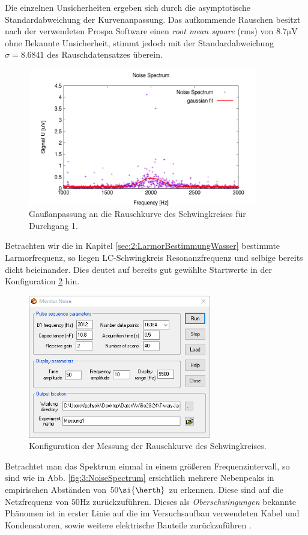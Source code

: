 \documentclass{article}
\begin{document}
    Die einzelnen Unsicherheiten ergeben sich durch die asymptotische Standardabweichung der Kurvenanpassung. Das aufkommende Rauschen besitzt nach der verwendeten Prospa Software einen \emph{root mean square} (rms) von $8.7\si{\micro\volt}$ ohne Bekannte Unsicherheit, stimmt jedoch mit der Standardabweichung $\sigma = 8.6841$ des Rauschdatensatzes überein. \\
    \begin{figure}[H]
        \centering
        \includegraphics[width=10cm]{../Bilddateien/Messung1_Noise_Spectrum_Gaussian.png}
        \caption{Gaußanpassung an die Rauschkurve des Schwingkreises für Durchgang 1.}
        \label{fig:3:GaussFit1}
    \end{figure}
    Betrachten wir die in Kapitel \ref{sec:2:LarmorBestimmungWasser} bestimmte Larmorfrequenz, so liegen LC-Schwingkreis Resonanzfrequenz und selbige bereits dicht beieinander. Dies deutet auf bereits gut gewählte Startwerte in der Konfiguration \ref{fig:3:MonitorNoiseConfig} hin. 
    \begin{figure}[H]
        \centering
        \includegraphics[width=8cm]{../Bilddateien/Sec3_Monitor_Noise_Configuration.png}
        \caption{Konfiguration der Messung der Rauschkurve des Schwingkreises.}
        \label{fig:3:MonitorNoiseConfig}
    \end{figure}
    Betrachtet man das Spektrum einmal in einem größeren Frequenzintervall, so sind wie in Abb. \ref{fig:3:NoiseSpectrum} ersichtlich mehrere Nebenpeaks in empirischen Abständen von $50\si{\herth}$ zu erkennen. Diese sind auf die Netzfrequenz von $50\si{\hertz}$ zurückzuführen. Dieses als \emph{Oberschwingungen} bekannte Phänomen ist in erster Linie auf die im Versuchsaufbau verwendeten Kabel und Kondensatoren, sowie weitere elektrische Bauteile zurückzuführen \cite[TÜV]{TUEV:Oberschwingungen}.
\end{document}
